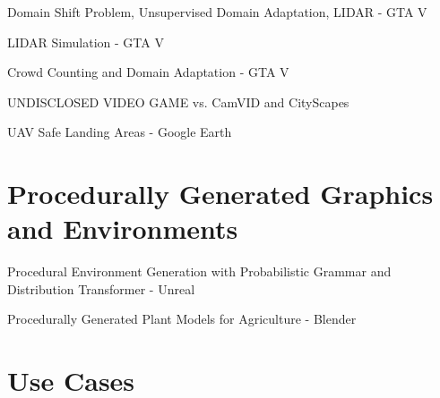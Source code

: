 Domain Shift Problem, Unsupervised Domain Adaptation, LIDAR - GTA V \cite{wu2019squeezesegv2}

LIDAR Simulation - GTA V \cite{hurl2019precise}

Crowd Counting and Domain Adaptation - GTA V \cite{wang2019learning}

UNDISCLOSED VIDEO GAME vs. CamVID and CityScapes \cite{shafaei2016play}

UAV Safe Landing Areas - Google Earth \cite{marcu2018safeuav}


\section{Procedurally Generated Graphics and Environments}
\label{sec:procedurally-generated}

Procedural Environment Generation with Probabilistic Grammar and Distribution Transformer - Unreal \cite{kar2019meta}

Procedurally Generated Plant Models for Agriculture - Blender \cite{barth2018data}

\section{Use Cases}
\label{sec:use-cases}

